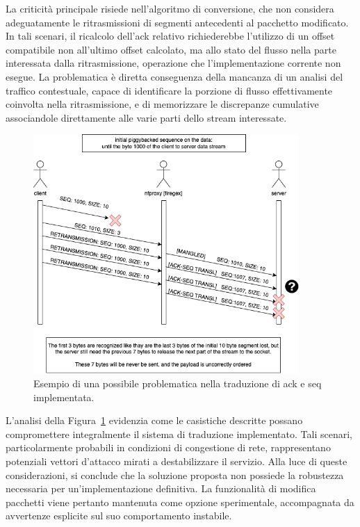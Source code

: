 La criticità principale risiede nell'algoritmo di conversione, che non considera adeguatamente le ritrasmissioni di segmenti antecedenti al pacchetto modificato. In tali scenari, il ricalcolo dell'\gls{ack} relativo richiederebbe l'utilizzo di un offset compatibile non all'ultimo offset calcolato, ma allo stato del flusso nella parte interessata dalla ritrasmissione, operazione che l'implementazione corrente non esegue. La problematica è diretta conseguenza della mancanza di un analisi del traffico contestuale, capace di identificare la porzione di flusso effettivamente coinvolta nella ritrasmissione, e di memorizzare le discrepanze cumulative associandole direttamente alle varie parti dello stream interessate.
\begin{figure}[H]
    \centering
    \includegraphics[width=0.90\textwidth]{images/chapter3/TCP_ack_seq_transl_failure.drawio.png}
    \caption{Esempio di una possibile problematica nella traduzione di \gls{ack} e \gls{seq} implementata.}\label{fig:tcp_ack_seq_transl_failure}
\end{figure}
L'analisi della Figura~\ref{fig:tcp_ack_seq_transl_failure} evidenzia come le casistiche descritte possano compromettere integralmente il sistema di traduzione implementato. Tali scenari, particolarmente probabili in condizioni di congestione di rete, rappresentano potenziali vettori d'attacco mirati a destabilizzare il servizio.
Alla luce di queste considerazioni, si conclude che la soluzione proposta non possiede la robustezza necessaria per un'implementazione definitiva. La funzionalità di modifica pacchetti viene pertanto mantenuta come opzione sperimentale, accompagnata da avvertenze esplicite sul suo comportamento instabile.


